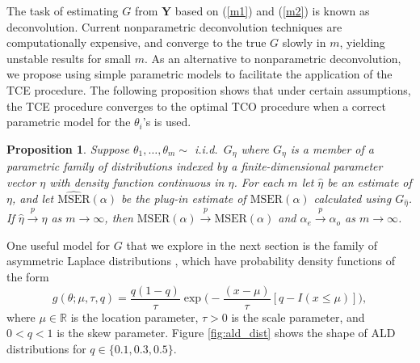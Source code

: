 \documentclass[11pt]{article}
\newcommand{\bs}[1]{{\boldsymbol #1}}
\newtheorem{proposition}{Proposition}[section]
\begin{document}
The task of estimating $G$ from $\bs Y$ based on (\ref{m1}) and (\ref{m2}) is known as deconvolution. Current nonparametric deconvolution techniques are computationally expensive, and converge to the true $G$ slowly in $m$, 
yielding unstable results for small $m$. 
As an alternative to nonparametric deconvolution, we propose using simple parametric models to facilitate the application of the TCE procedure. The following proposition shows that under certain assumptions, the TCE procedure converges to 
the optimal TCO procedure when a correct 
parametric model for the $\theta_i$'s is used.

\begin{proposition}
  \label{prop:tcetotco}
	Suppose $\theta_1,\ldots, \theta_m\sim$ i.i.d.\ $G_\eta$ where $G_\eta$ is a member of a parametric family of distributions indexed by a finite-dimensional parameter vector $\eta$ with density function continuous in $\eta$. 
For each $m$ let $\hat \eta$ be an estimate of $\eta$, and let 
$\widehat{\text{MSER}}(\alpha)$ be the plug-in estimate of 
$\text{MSER}(\alpha)$ calculated using $G_{\hat \eta}$. 
If $\hat \eta  \stackrel{p}\rightarrow \eta$ as $m\rightarrow \infty$, then 
$\widehat{\text{MSER}}(\alpha) \stackrel{p}\rightarrow 
\text{MSER}(\alpha)$ 
and $\alpha_e \stackrel{p}\rightarrow \alpha_o$ 
as  $m\rightarrow \infty$. 
\end{proposition}

One useful model for $G$ that we explore in the next section is the 
family of 
asymmetric Laplace distributions \citep{yu2005three}, which have probability density functions of the form
\begin{equation*}
	g(\theta; \mu,\tau,q) = \frac{q(1-q)}{\tau}\exp\big( -\frac{(x-\mu)}{\tau}[q - I(x\leq\mu)]  \big),
\end{equation*}
where $\mu \in \mathbb{R}$ is the location parameter, $\tau>0$ is the scale parameter, and $0< q <1$ is the skew parameter. Figure \ref{fig:ald_dist} shows the shape of ALD distributions for $q\in \{0.1, 0.3, 0.5\}$. 
\end{document}
